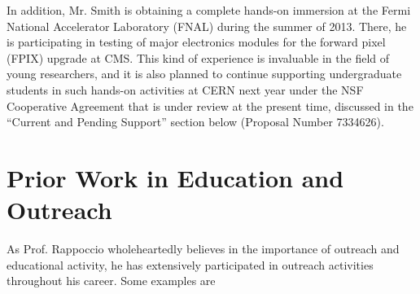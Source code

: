 \documentclass[12pt]{proposalnsf}
\begin{document}
In addition, Mr. Smith is obtaining a complete hands-on immersion at the
Fermi National Accelerator Laboratory (FNAL) during the summer of
2013. There, he is participating in testing of major electronics
modules for the forward pixel (FPIX) upgrade at CMS. This kind of
experience is invaluable in the field of young researchers, and it is also
planned to continue supporting undergraduate students in such hands-on
activities at CERN next year under the NSF Cooperative Agreement that is
under review at the present time, discussed in the ``Current and
Pending Support'' section below (Proposal Number 7334626). 

\section{Prior Work in Education and Outreach}

As Prof. Rappoccio wholeheartedly believes in the importance of outreach and
educational activity, he has extensively participated in outreach
activities throughout his career. Some examples are
\end{document}

